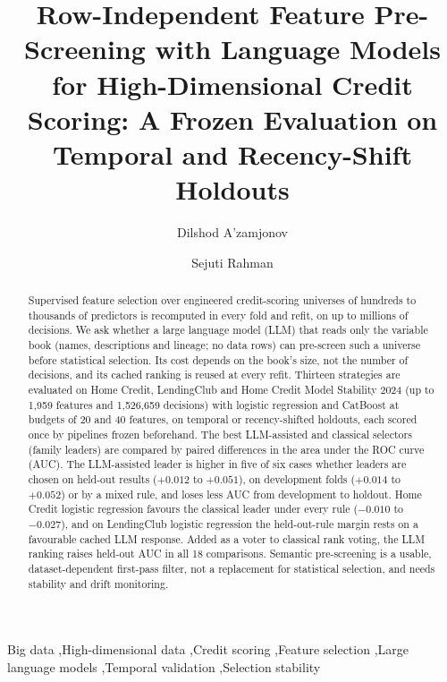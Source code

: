\documentclass[final,5p,twocolumn]{elsarticle}
\begin{document}
\begin{frontmatter}

\title{Row-Independent Feature Pre-Screening with Language Models for High-Dimensional Credit Scoring: A Frozen Evaluation on Temporal and Recency-Shift Holdouts}

\author[aff1,aff3]{Dilshod A'zamjonov}

\author[aff2]{Sejuti Rahman}


\address[aff1]{Department of Engineering, New Uzbekistan University, 1 Movarounnahr Street, Mirzo Ulugbek District, Tashkent, Uzbekistan}
\address[aff2]{Department of Computing, New Uzbekistan University, 1 Movarounnahr Street, Mirzo Ulugbek District, Tashkent, Uzbekistan}
\address[aff3]{Central Bank of the Republic of Uzbekistan, 6 Islam Karimov Street, Tashkent 100001, Uzbekistan}

\begin{abstract}
Supervised feature selection over engineered credit-scoring universes of hundreds to thousands of predictors is recomputed in every fold and refit, on up to millions of decisions. We ask whether a large language model (LLM) that reads only the variable book (names, descriptions and lineage; no data rows) can pre-screen such a universe before statistical selection. Its cost depends on the book's size, not the number of decisions, and its cached ranking is reused at every refit. Thirteen strategies are evaluated on Home Credit, LendingClub and Home Credit Model Stability 2024 (up to 1,959 features and 1,526,659 decisions) with logistic regression and CatBoost at budgets of 20 and 40 features, on temporal or recency-shifted holdouts, each scored once by pipelines frozen beforehand. The best LLM-assisted and classical selectors (family leaders) are compared by paired differences in the area under the ROC curve (AUC). The LLM-assisted leader is higher in five of six cases whether leaders are chosen on held-out results ($+0.012$ to $+0.051$), on development folds ($+0.014$ to $+0.052$) or by a mixed rule, and loses less AUC from development to holdout. Home Credit logistic regression favours the classical leader under every rule ($-0.010$ to $-0.027$), and on LendingClub logistic regression the held-out-rule margin rests on a favourable cached LLM response. Added as a voter to classical rank voting, the LLM ranking raises held-out AUC in all 18 comparisons. Semantic pre-screening is a usable, dataset-dependent first-pass filter, not a replacement for statistical selection, and needs stability and drift monitoring.
\end{abstract}

\begin{keyword}
Big data \sep High-dimensional data \sep Credit scoring \sep Feature selection \sep Large language models \sep Temporal validation \sep Selection stability
\end{keyword}

\end{frontmatter}
\end{document}
